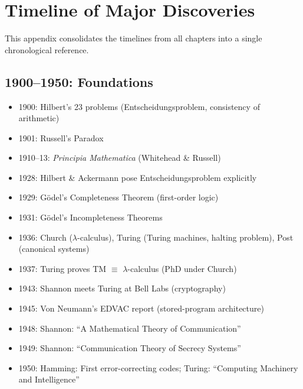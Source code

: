 
\chapter{Timeline of Major Discoveries}
\label{app:timeline}

This appendix consolidates the timelines from all chapters into a single chronological reference.

\section{1900--1950: Foundations}
\begin{itemize}
\item 1900: Hilbert's 23 problems (Entscheidungsproblem, consistency of arithmetic)
\item 1901: Russell's Paradox
\item 1910--13: \emph{Principia Mathematica} (Whitehead \& Russell)
\item 1928: Hilbert \& Ackermann pose Entscheidungsproblem explicitly
\item 1929: Gödel's Completeness Theorem (first-order logic)
\item 1931: Gödel's Incompleteness Theorems
\item 1936: Church ($\lambda$-calculus), Turing (Turing machines, halting problem), Post (canonical systems)
\item 1937: Turing proves TM $\equiv$ $\lambda$-calculus (PhD under Church)
\item 1943: Shannon meets Turing at Bell Labs (cryptography)
\item 1945: Von Neumann's EDVAC report (stored-program architecture)
\item 1948: Shannon: ``A Mathematical Theory of Communication''
\item 1949: Shannon: ``Communication Theory of Secrecy Systems''
\item 1950: Hamming: First error-correcting codes; Turing: ``Computing Machinery and Intelligence''
\end{itemize}

